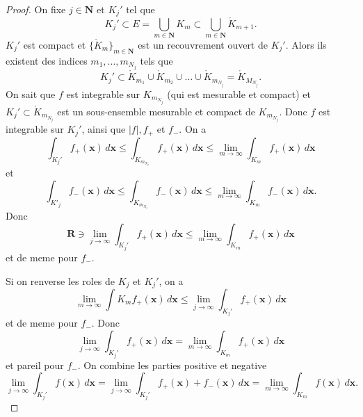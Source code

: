\begin{proof}
On fixe $j\in \mathbf{N}$ et $K_{j}'$ tel que 
$$K_{j}'\subset E=\bigcup _{m\in \mathbf{N}}K_{m}\subset \bigcup _{m\in \mathbf{N}}{\mathring{ K }_{m+1}}.$$
$K_{j}'$ est compact et $\{ {\mathring{ K }_{m}} \}_{m\in \mathbf{N}}$ est un recouvrement ouvert de $K_{j}'$. Alors ils existent des indices $m_{1},\dots,m_{N_{j}}$ tels que
$$
K_{j}'\subset {\mathring{ K }}_{m_{1}}\cup {\mathring{ K }}_{m_{2}}\cup\dots \cup {\mathring{ K }_{m_{N_{j}}}}={\mathring{ K }}_{M_{N_{j}}}.
$$
On sait que $f$ est integrable sur $K_{m_{N_{j}}}$ (qui est mesurable et compact) et $K_{j}'\subset \mathring{ K }_{m_{N_{j}}}$ est un sous-ensemble mesurable et compact de $K_{m_{N_{j}}}$. Donc $f$ est integrable sur $K_{j}'$, ainsi que $|f|, f_{+}$ et $f_{-}$. On a
$$
\int _{K_{j}'}f_{+}(\boldsymbol{x}) \, d\boldsymbol{x}\le\int _{K_{m_{N_{j}}}}f_{+}(\boldsymbol{x}) \, d\boldsymbol{x} \le \lim_{ m \to \infty } \int _{K_{m}}f_{+}(\boldsymbol{x}) \, d\boldsymbol{x}
$$
et
$$
\int _{K'_{j}}f_{-}(\boldsymbol{x}) \, d\boldsymbol{x}\le \int _{K_{m_{N_{j}}}}f_{-}(\boldsymbol{x}) \, d\boldsymbol{x}\le \lim_{ m \to \infty } \int _{K_{m}}f_{-}(\boldsymbol{x}) \, d\boldsymbol{x} .  
$$
Donc
$$
\mathbf{R} \ni\lim_{ j \to \infty } \int _{K_{j}'}f_{+}(\boldsymbol{x})\,d\boldsymbol{x}\le \lim_{ m \to \infty } \int _{K_{m}}f_{+}(\boldsymbol{x}) \, d\boldsymbol{x}
$$
et de meme pour $f_{-}$.

Si on renverse les roles de $K_{j}$ et $K_{j}'$, on a
$$
\lim_{ m \to \infty } \int K_{m}f_{+}(\boldsymbol{x}) \, d\boldsymbol{x} \le \lim_{ j \to \infty } \int _{K_{j}'}f_{+}(\boldsymbol{x}) \, d\boldsymbol{x}
$$
et de meme pour $f_{-}$. Donc
$$
\lim_{ j \to \infty } \int _{K_{j}'}f_{+}(\boldsymbol{x}) \, d\boldsymbol{x}=\lim_{ m \to \infty } \int _{K_{m}}f_{+}(\boldsymbol{x})\,d\boldsymbol{x}
$$
et pareil pour $f_{-}$. On combine les parties positive et negative 
$$
\lim_{ j \to \infty } \int _{K_{j}'}f(\boldsymbol{x}) \, d\boldsymbol{x}=\lim_{ j \to \infty } \int _{K_{j}'}f_{+}(\boldsymbol{x})+f_{-}(\boldsymbol{x})\,d\boldsymbol{x} =\lim_{ m \to \infty } \int _{K_{m}}f(\boldsymbol{x}) \, d\boldsymbol{x}. 
$$
\end{proof}
